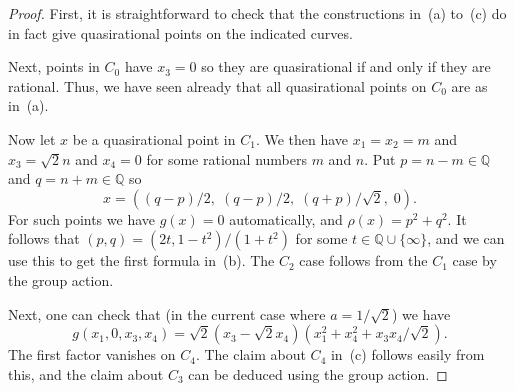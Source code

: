\documentclass[reqno]{amsart}
\newcommand{\Q}         {{\mathbb{Q}}}
\newcommand{\rt}        {\sqrt{2}}
\renewcommand{\:}{\colon}
\theoremstyle{definition}
\begin{document}
\begin{proof}
 First, it is straightforward to check that the constructions in~(a)
 to~(c) do in fact give quasirational points on the indicated curves.

 Next, points in $C_0$ have $x_3=0$ so they are quasirational if and
 only if they are rational.  Thus, we have seen already that all
 quasirational points on $C_0$ are as in~(a).

 Now let $x$ be a quasirational point in $C_1$.  We then have
 $x_1=x_2=m$ and $x_3=\rt n$ and $x_4=0$ for some rational numbers $m$
 and $n$.  Put $p=n-m\in\Q$ and $q=n+m\in\Q$ so
 \[ x = \left((q-p)/2,\;(q-p)/2,\;(q+p)/\rt,\;0\right). \]
 For such points we have $g(x)=0$ automatically, and
 $\rho(x)=p^2+q^2$.  It follows that $(p,q)=(2t,1-t^2)/(1+t^2)$ for
 some $t\in\Q\cup\{\infty\}$, and we can use this to get the first
 formula in~(b).  The $C_2$ case follows from the $C_1$ case by the
 group action.

 Next, one can check that (in the current case where $a=1/\rt$) we
 have
 \[ g(x_1,0,x_3,x_4) = \rt(x_3-\rt x_4)(x_1^2+x_4^2+x_3x_4/\rt). \]
 The first factor vanishes on $C_4$.  The claim about $C_4$ in~(c)
 follows easily from this, and the claim about $C_3$ can be deduced
 using the group action.


\end{proof}
\end{document}
